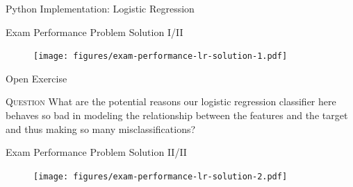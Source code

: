 \documentclass[main.tex]{subfiles}
\begin{document}
    \begin{frame}{Python Implementation: Logistic Regression}
        
    \end{frame}

    \begin{frame}{Exam Performance Problem Solution I/II}
        \begin{figure}
            \label{fig:exam-performance-lr-solution-1}
            \texttt{[image: figures/exam-performance-lr-solution-1.pdf]}
        \end{figure}
    \end{frame}

        \begin{frame}{Open Exercise }
        \begin{alertblock}{\textsc{Question}}
            What are the potential reasons our logistic regression classifier here behaves so bad in modeling the relationship between the features and the target and thus making so many misclassifications?
        \end{alertblock}
    \end{frame}

    \begin{frame}{Exam Performance Problem Solution II/II}
        \begin{figure}
            \label{fig:exam-performance-lr-solution-2}
            \texttt{[image: figures/exam-performance-lr-solution-2.pdf]}
        \end{figure}
    \end{frame}
\end{document}
